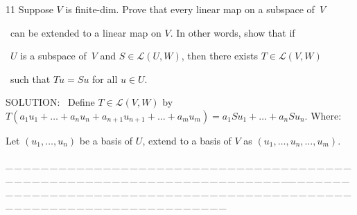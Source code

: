 \documentclass[a4paper, 11pt, UTF8]{article}
\def\Lm{\mathcal{L}}
\begin{document}
\begin{large}
{\timesbf\Large 11} {\timessl\Large 
Suppose $V$ is finite-dim. Prove that every linear map on a subspace of \,$V$}\par\quad\,
{\timessl\Large can be extended to a linear map on $V$. In other words, show that if}\par\quad\,
{\timessl\Large $U$ is a subspace of \,$V$ and $S\in\Lm(U, W)$, then there exists $T\in\Lm(V, W)$}\par\quad\,
{\timessl\Large such that $Tu = Su$ for all $u\in U$.
}\par
{\timesbf S\footnotesize{OLUTION:}}\,\,\,
Define $T\in\Lm(V,W)$ by $T(a_1 u_1+\dots+a_n u_n+a_{n+1}u_{n+1}+\dots+a_m u_m)=a_1 Su_1+\dots+a_n Su_n.$ Where:\par\qquad\qquad\qquad\qquad\qquad\qquad\qquad
Let $(u_1,\dots,u_n)$ be a basis of $U$, extend to a basis of $V$ as $(u_1,\dots,u_n,\dots,u_m)$.\par
{\tiny \_\,\_\,\_\,\_\,\_\,\_\,\_\,\_\,\_\,\_\,\_\,\_\,\_\,\_\,\_\,\_\,\_\,\_\,\_\,\_\,\_\,\_\,\_\,\_\,\_\,\_\,\_\,\_\,\_\,\_\,\_\,\_\,\_\,\_\,\_\,\_\,\_\,\_\,\_\,\_\,\_\,\_\,\_\,\_\,\_\,\_\,\_\,\_\,\_\,\_\,\_\,\_\,\_\,\_\,\_\,\_\,\_\,\_\,\_\,\_\,\_\,\_\,\_\,\_\,\_\,\_\,\_\,\_\,\_\,\_\,\_\_\,\_\,\_\,\_\,\_\,\_\,\_\,\_\,\_\,\_\,\_\,\_\,\_\,\_\,\_\,\_\,\_\,\_\,\_\,\_\,\_\,\_\,\_\,\_\,\_\,\_\,\_\,\_\,\_\,\_\,\_\,\_\,\_\,\_\,\_\,\_\,\_\,\_\,\_\,\_\,\_\,\_\,\_\,\_\,\_\,\_\,\_\,\_\,\_\,\_\,\_\,\_\,\_\,\_\,\_\,\_\,\_\,\_\,\_\,\_\,\_\,\_\,\_\,\_\,\_\,\_\,\_\,\_\,\_\,\_\,\_}{\tiny\,\par}


\end{large}
\end{document}
